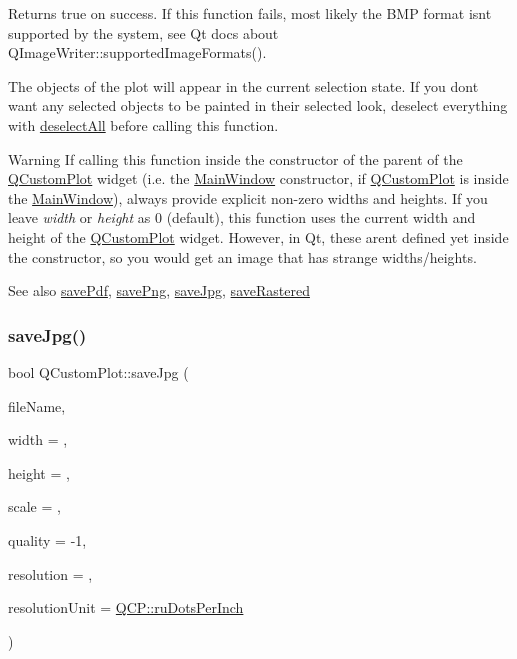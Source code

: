 Returns true on success. If this function fails, most likely the B\+MP format isn\textquotesingle{}t supported by the system, see Qt docs about Q\+Image\+Writer\+::supported\+Image\+Formats().

The objects of the plot will appear in the current selection state. If you don\textquotesingle{}t want any selected objects to be painted in their selected look, deselect everything with \hyperlink{classQCustomPlot_a9d4808ab925b003054085246c92a257c}{deselect\+All} before calling this function.

\begin{DoxyWarning}{Warning}
If calling this function inside the constructor of the parent of the \hyperlink{classQCustomPlot}{Q\+Custom\+Plot} widget (i.\+e. the \hyperlink{classMainWindow}{Main\+Window} constructor, if \hyperlink{classQCustomPlot}{Q\+Custom\+Plot} is inside the \hyperlink{classMainWindow}{Main\+Window}), always provide explicit non-\/zero widths and heights. If you leave {\itshape width} or {\itshape height} as 0 (default), this function uses the current width and height of the \hyperlink{classQCustomPlot}{Q\+Custom\+Plot} widget. However, in Qt, these aren\textquotesingle{}t defined yet inside the constructor, so you would get an image that has strange widths/heights.
\end{DoxyWarning}
\begin{DoxySeeAlso}{See also}
\hyperlink{classQCustomPlot_ad5acd34f6b39c3516887d7e54fec2412}{save\+Pdf}, \hyperlink{classQCustomPlot_ac92cc9256d12f354b40a4be4600b5fb9}{save\+Png}, \hyperlink{classQCustomPlot_a76f0d278e630a711fa6f48048cfd83e4}{save\+Jpg}, \hyperlink{classQCustomPlot_ad7723ce2edfa270632ef42b03a444352}{save\+Rastered} 
\end{DoxySeeAlso}
\mbox{\label{classQCustomPlot_a76f0d278e630a711fa6f48048cfd83e4}} 
\subsubsection{\texorpdfstring{save\+Jpg()}{saveJpg()}}
{\footnotesize\ttfamily bool Q\+Custom\+Plot\+::save\+Jpg (\begin{DoxyParamCaption}\item[{const Q\+String \&}]{file\+Name,  }\item[{int}]{width = {},  }\item[{int}]{height = {},  }\item[{double}]{scale = {},  }\item[{int}]{quality = {\ttfamily -\/1},  }\item[{int}]{resolution = {},  }\item[{\hyperlink{namespaceQCP_a715d46153da230990aa887d0f0602452}{Q\+C\+P\+::\+Resolution\+Unit}}]{resolution\+Unit = {\ttfamily \hyperlink{namespaceQCP_a715d46153da230990aa887d0f0602452affb887d8efe79c39a1aca2acd7002afc}{Q\+C\+P\+::ru\+Dots\+Per\+Inch}} }\end{DoxyParamCaption})}


